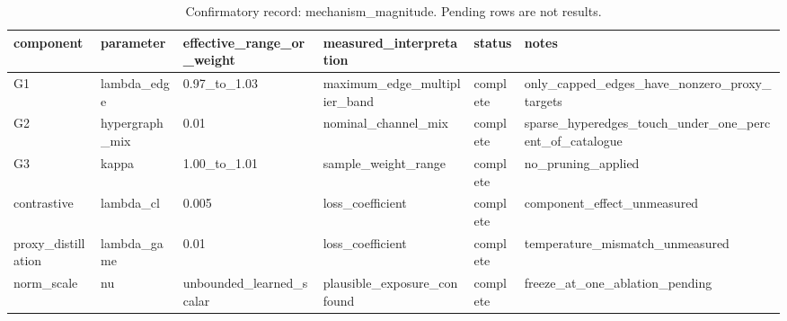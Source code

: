 \begin{table}[t]
\centering
\caption{Confirmatory record: mechanism\_magnitude. Pending rows are not results.}
\begin{tabular}{llllll}
\toprule
\textbf{component} & \textbf{parameter} & \textbf{effective\_range\_or\_weight} & \textbf{measured\_interpretation} & \textbf{status} & \textbf{notes} \\
\midrule
G1 & lambda\_edge & 0.97\_to\_1.03 & maximum\_edge\_multiplier\_band & complete & only\_capped\_edges\_have\_nonzero\_proxy\_targets \\
G2 & hypergraph\_mix & 0.01 & nominal\_channel\_mix & complete & sparse\_hyperedges\_touch\_under\_one\_percent\_of\_catalogue \\
G3 & kappa & 1.00\_to\_1.01 & sample\_weight\_range & complete & no\_pruning\_applied \\
contrastive & lambda\_cl & 0.005 & loss\_coefficient & complete & component\_effect\_unmeasured \\
proxy\_distillation & lambda\_game & 0.01 & loss\_coefficient & complete & temperature\_mismatch\_unmeasured \\
norm\_scale & nu & unbounded\_learned\_scalar & plausible\_exposure\_confound & complete & freeze\_at\_one\_ablation\_pending \\
\bottomrule
\end{tabular}
\end{table}
